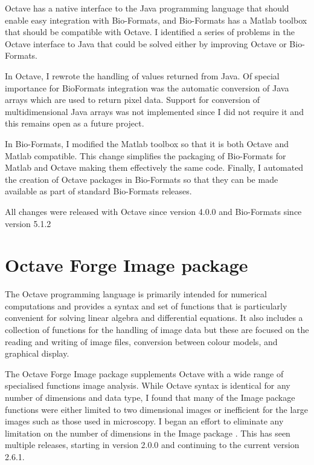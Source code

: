 Octave has a native interface to the Java programming language
that should enable easy integration with
Bio-Formats, and Bio-Formats has a Matlab toolbox that should be
compatible with Octave.
I identified a series of problems in the Octave interface to Java that
could be solved either by improving Octave or Bio-Formats.

In Octave, I rewrote the handling of values returned from Java.
Of special importance for BioFormats integration was the automatic conversion of
Java arrays which are used to return pixel data.
Support for conversion of multidimensional Java arrays was not implemented
since I did not require it and this remains open as a future project.

In Bio-Formats, I modified the Matlab toolbox so that it is
both Octave and Matlab compatible.
This change simplifies the packaging of
Bio-Formats for Matlab and Octave making them
effectively the same code.
Finally, I automated the creation of Octave packages in Bio-Formats
so that they can be made available as part of standard Bio-Formats releases.

All changes were released with Octave since version 4.0.0 and
Bio-Formats since version 5.1.2

\section{Octave Forge Image package}

The Octave programming language is primarily intended for numerical
computations and provides a syntax and set of functions that is particularly
convenient for solving linear algebra and differential equations.  It
also includes a collection of functions for the handling of image data
but these are focused on the reading and writing of image files,
conversion between colour models, and graphical display.

The Octave Forge Image package supplements Octave with a wide range of
specialised functions image analysis.  While Octave syntax is
identical for any number of dimensions and data type, I found that
many of the Image package functions were either limited to two
dimensional images or inefficient for the large images such as those used in
microscopy.  I began an effort to eliminate any
limitation on the number of dimensions in the Image package
.  This has seen multiple
releases, starting in version 2.0.0 and continuing to the current
version 2.6.1.

